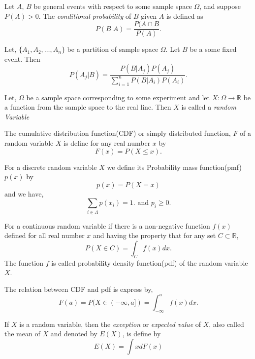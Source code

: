 \begin{definition}
	Let $A$, $B$ be general events with respect to some sample space $ \Omega $,
	and suppose $ P(A)>0 $. The \textit{conditional probability} of $ B $ given $ A $ is defined as 
	\[
		P(B|A) = \frac{P(A\cap B}{P(A)}.
	\]
\end{definition}

\begin{theorem}
	Let, $ \{ A_1,A_2,\ldots,A_n \} $ be a partition of sample space $ \Omega $. 
	Let $ B $ be a some fixed event. Then
	\[
		P(A_j|B) = \frac{P(B|A_j)P(A_j)}{\sum_{i=1}^{n}P(B|A_i)P(A_i) }.
	\]
\end{theorem}

\begin{definition}
	Let, $ \Omega $ be a sample space corresponding to some experiment and let 
	$ X:\Omega\to \mathds{R} $ be a function from the sample space to the real line. 
	Then $ X $ is called a \textit{random Variable}
\end{definition}

\begin{definition}
	The cumulative distribution function(CDF) or simply distributed function, $ F $ of 
	a random variable $ X $ is define for any real number $ x $ by
	\[
		F(x) = P(X \le x).
	\]
\end{definition}

\begin{definition}
	For a discrete random variable $ X $ we define its Probability mass function(pmf)
	$ p(x) $ by
	\[
		p(x) = P(X=x)
	\]
	and we have,
	\[
		\sum_{i\in \Lambda} p(x_i) = 1. \text{ and } p_i \ge 0. 
	\]
\end{definition}

\begin{definition}
	For a continuous random variable if there is a non-negative function $ f(x) $
	defined for all real number $ x $ and having the property that for any set $ C\subset \mathds{R} $,
	\[
		P(X\in C) = \int_{C}f(x) dx 
		.\]
	The function $ f $ is called probability density function(pdf) of the random variable $ X $.
\end{definition}

The relation between CDF and pdf is express by,
\[
	F(a) = P(X\in (-\infty, a]) = \int_{-\infty}^{a} f(x) dx.
\]

\begin{definition}[Exception]
	If $ X $ is a random variable,
	then the \textit{exception} or \textit{expected value} of $ X $, also called the mean of $ X $ and denoted by $ E(X) $, is define by
	\[
		E(X) = \int xdF(x) 
	\]
\end{definition}

